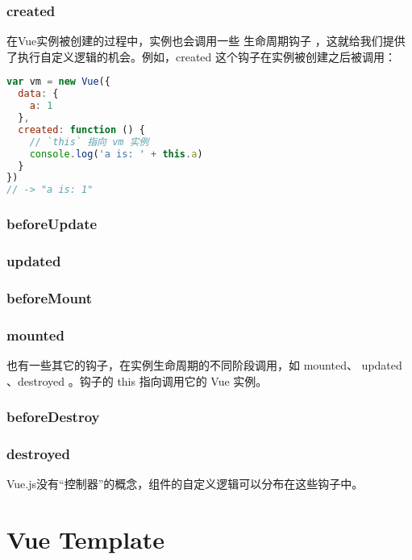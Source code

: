 \subsection{created}


在Vue实例被创建的过程中，实例也会调用一些 生命周期钩子 ，这就给我们提供了执行自定义逻辑的机会。例如，created 这个钩子在实例被创建之后被调用：

\begin{lstlisting}[language=JavaScript]
var vm = new Vue({
  data: {
    a: 1
  },
  created: function () {
    // `this` 指向 vm 实例
    console.log('a is: ' + this.a)
  }
})
// -> "a is: 1"
\end{lstlisting}


\subsection{beforeUpdate}


\subsection{updated}




\subsection{beforeMount}



\subsection{mounted}


也有一些其它的钩子，在实例生命周期的不同阶段调用，如 mounted、 updated 、destroyed 。钩子的 this 指向调用它的 Vue 实例。

\subsection{beforeDestroy}


\subsection{destroyed}



Vue.js没有“控制器”的概念，组件的自定义逻辑可以分布在这些钩子中。

\chapter{Vue Template}


